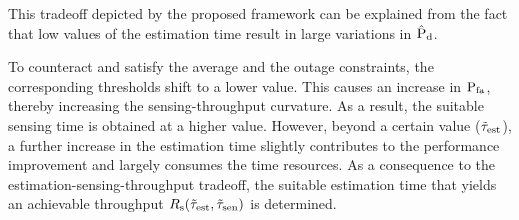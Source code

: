{{\begin{figure}[!h]
{\label{fig_IS:EST_ac}}
\hfil
{}
\caption{}
\label{fig_IS:EST}
\end{figure}

This tradeoff depicted by the proposed framework can be explained from the fact that low values of the estimation time result in large variations in $\hat{\text{P}}_{\text{d}}$.} To counteract and satisfy the average and the outage constraints, the corresponding thresholds shift to a lower value. This causes an increase in $\text{P}_{\text{fa}}$, thereby increasing the sensing-throughput curvature. As a result, the suitable sensing time is obtained at a higher value. However, beyond a certain value ($\tilde{\tau}_{\text{est}}$), a further increase in the estimation time slightly contributes to the performance improvement and largely consumes the time resources. As a consequence to the estimation-sensing-throughput tradeoff, the suitable estimation time that yields an achievable throughput $R_{\text{s}}(\tilde{\tau}_{\text{est}},\tilde{\tau}_{\text{sen}})$ is determined.


}
